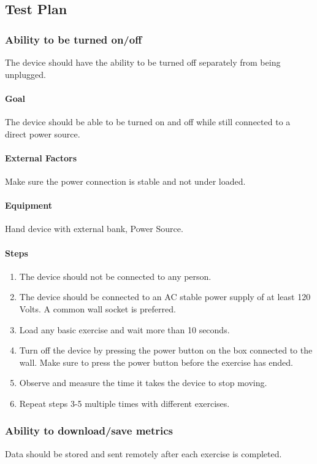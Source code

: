 \documentclass{article}
\begin{document}
\subsection{Test Plan}
\subsubsection{Ability to be turned on/off}
The device should have the ability to be turned off separately from being unplugged.

\paragraph{Goal} The device should be able to be turned on and off while still connected to a direct power source.

\paragraph{External Factors} Make sure the power connection is stable and not under loaded.

\paragraph{Equipment} Hand device with external bank, Power Source.

\paragraph{Steps}
\begin{enumerate}
\item The device should not be connected to any person.
\item The device should be connected to an AC stable power supply of at least 120 Volts. A common wall socket is preferred.
\item Load any basic exercise and wait more than 10 seconds.
\item Turn off the device by pressing the power button on the box connected to the wall. Make sure to press the power button before the exercise has ended.
\item Observe and measure the time it takes the device to stop moving.
\item Repeat steps 3-5 multiple times with different exercises.
\end{enumerate}

\subsubsection{Ability to download/save metrics}
Data should be stored and sent remotely after each exercise is completed.
\end{document}

